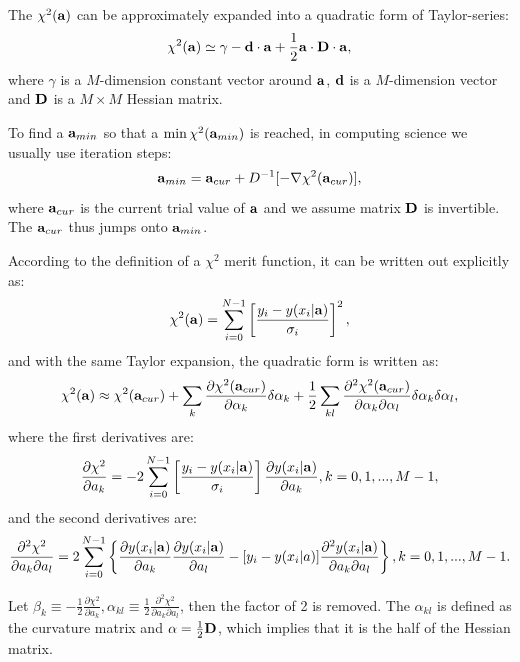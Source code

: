 The $\chi^2(\bf a)$ can be approximately expanded into a quadratic form of Taylor-series:
\begin{equation} \label{eq:1}
\chi^2({\bf a})\simeq \gamma-{\bf d\cdot a}+\frac{1}{2}{\bf a\cdot D\cdot a},
\end{equation}
where $\gamma$ is a $M$-dimension constant vector around $\bf a$, $\bf d$ is a $M$-dimension vector and $\bf D$ is a $M\times M$ Hessian matrix.

To find a ${\bf a}_{min}$ so that a $\min\chi^2({\bf a}_{min})$ is reached, in computing science we usually use iteration steps: 
\begin{equation} \label{eq:2}{\bf a}_{min}={\bf a}_{cur}+D^{-1}[-\nabla\chi^2({\bf a}_{cur})],\end{equation} 
where ${\bf a}_{cur}$ is the current trial value of $\bf a$ and we assume matrix $\bf D$ is invertible. The ${\bf a}_{cur}$ thus jumps onto ${\bf a}_{min}$. 

According to the definition of a $\chi^2$ merit function, it can be written out explicitly as:
\begin{equation}
\chi^2({\bf a})=\sum_{i=0}^{N-1}\left[\frac{y_i-y(x_i|{\bf a})}{\sigma_i}\right]^2,
\end{equation}
and with the same Taylor expansion, the quadratic form is written as:
\begin{equation}\label{eq:3}
\chi^2({\bf a})\approx\chi^2({\bf a}_{cur})+\sum_k\frac{\partial \chi^2({\bf a}_{cur})}{\partial \alpha_k}\delta\alpha_k+\frac{1}{2}\sum_{kl}\frac{\partial^2\chi^2({\bf a}_{cur})}{\partial\alpha_k\partial\alpha_l}\delta\alpha_k\delta\alpha_l, 
\end{equation}
where the first derivatives are:
\begin{equation}\label{eq:4}
\frac{\partial \chi^2}{\partial a_k}=-2\sum_{i=0}^{N-1}\left[\frac{y_i-y(x_i|{\bf a})}{\sigma_i}\right]\frac{\partial y(x_i|{\bf a})}{\partial a_k}, k = 0,1,...,M-1,
\end{equation}
and the second derivatives are:
\begin{equation}\label{eq:5}
\frac{\partial^2 \chi^2}{\partial a_k\partial a_l}=2\sum_{i=0}^{N-1}\left\{\frac{\partial y(x_i|{\bf a})}{\partial a_k}\frac{\partial y(x_i|{\bf a})}{\partial a_l}-[y_i-y(x_i|a)]\frac{\partial^2 y(x_i|{\bf a})}{\partial a_k\partial a_l}\right\}, k = 0, 1, ..., M-1.
\end{equation}

Let $\beta_k\equiv-\frac{1}{2}\frac{\partial\chi^2}{\partial a_k}, \alpha_{kl}\equiv \frac{1}{2}\frac{\partial^2\chi^2}{\partial a_k\partial a_l}$, then the factor of 2 is removed. The $\alpha_{kl}$ is defined as the curvature matrix and ${\bf \alpha}=\frac{1}{2}{\bf D}$, which implies that it is the half of the Hessian matrix.

